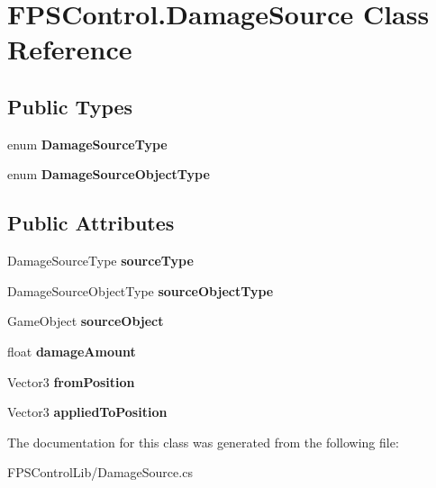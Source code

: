 \hypertarget{class_f_p_s_control_1_1_damage_source}{\section{F\-P\-S\-Control.\-Damage\-Source Class Reference}
\label{class_f_p_s_control_1_1_damage_source}
}
\subsection*{Public Types}
\begin{DoxyCompactItemize}
\item 
enum {\bfseries Damage\-Source\-Type} 
\item 
enum {\bfseries Damage\-Source\-Object\-Type} 
\end{DoxyCompactItemize}
\subsection*{Public Attributes}
\begin{DoxyCompactItemize}
\item 
\hypertarget{class_f_p_s_control_1_1_damage_source_a74fd8020f9598e600d3ffda2a056ddac}{Damage\-Source\-Type {\bfseries source\-Type}}\label{class_f_p_s_control_1_1_damage_source_a74fd8020f9598e600d3ffda2a056ddac}

\item 
\hypertarget{class_f_p_s_control_1_1_damage_source_a0403af3daaa526be01ca3bb58e1074d8}{Damage\-Source\-Object\-Type {\bfseries source\-Object\-Type}}\label{class_f_p_s_control_1_1_damage_source_a0403af3daaa526be01ca3bb58e1074d8}

\item 
\hypertarget{class_f_p_s_control_1_1_damage_source_a52e993a7489059545eb5e0496d943794}{Game\-Object {\bfseries source\-Object}}\label{class_f_p_s_control_1_1_damage_source_a52e993a7489059545eb5e0496d943794}

\item 
\hypertarget{class_f_p_s_control_1_1_damage_source_a1908fc263b96dc0c3d2aa52446e48f74}{float {\bfseries damage\-Amount}}\label{class_f_p_s_control_1_1_damage_source_a1908fc263b96dc0c3d2aa52446e48f74}

\item 
\hypertarget{class_f_p_s_control_1_1_damage_source_a514f5ffc653055e940384cf7bed4a725}{Vector3 {\bfseries from\-Position}}\label{class_f_p_s_control_1_1_damage_source_a514f5ffc653055e940384cf7bed4a725}

\item 
\hypertarget{class_f_p_s_control_1_1_damage_source_a26b09305b2d02551bbeb38d8b2461ad2}{Vector3 {\bfseries applied\-To\-Position}}\label{class_f_p_s_control_1_1_damage_source_a26b09305b2d02551bbeb38d8b2461ad2}

\end{DoxyCompactItemize}


The documentation for this class was generated from the following file\-:\begin{DoxyCompactItemize}
\item 
F\-P\-S\-Control\-Lib/Damage\-Source.\-cs\end{DoxyCompactItemize}
